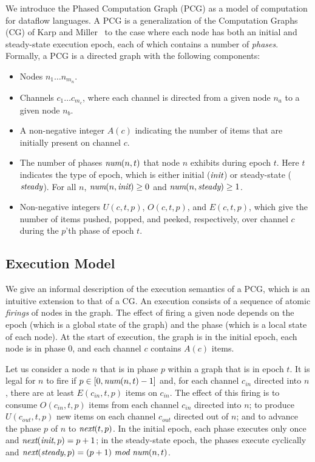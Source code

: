 We introduce the Phased Computation Graph (PCG) as a model of
computation for dataflow languages.  A PCG is a generalization of the
Computation Graphs (CG) of Karp and Miller~\cite{KM66} to the case
where each node has both an initial and steady-state execution epoch,
each of which contains a number of {\it phases}.  Formally, a PCG is a
directed graph with the following components:
\begin{itemize}

\item Nodes $n_1 \dots n_{m_n}$.

\item Channels $c_1 \dots c_{m_c}$, where each channel is directed
from a given node $n_a$ to a given node $n_b$.

\item A non-negative integer $A(c)$ indicating the number of items
  that are initially present on channel $c$.

\item The number of phases $\mbox{\it num}(n, t)$ that node $n$ exhibits
during epoch $t$.  Here $t$ indicates the type of epoch, which is
either initial ($\mbox{\it init}$) or steady-state ($\mbox{\it steady}$).  For all
$n$, $\mbox{\it num}(n, \mbox{\it init}) \ge 0$ and $\mbox{\it num}(n, \mbox{\it steady}) \ge
1$.

\item Non-negative integers $U(c, t, p)$, $O(c, t, p)$, and $E(c, t,
p)$, which give the number of items pushed, popped, and peeked,
respectively, over channel $c$ during the $p$'th phase of epoch $t$.

\end{itemize}

\subsection{Execution Model}

We give an informal description of the execution semantics of a PCG,
which is an intuitive extension to that of a CG.  An execution
consists of a sequence of atomic {\it firings} of nodes in the graph.
The effect of firing a given node depends on the epoch (which is a
global state of the graph) and the phase (which is a local state of
each node). At the start of execution, the graph is in the initial
epoch, each node is in phase 0, and each channel $c$ contains $A(c)$
items.

Let us consider a node $n$ that is in phase $p$ within a graph that is
in epoch $t$.  It is legal for $n$ to fire if $p \in [0, \mbox{\it num}(n,
t)-1]$ and, for each channel $c_{in}$ directed into $n$, there are at
least $E(c_{in}, t, p)$ items on $c_{in}$.  The effect of this firing
is to consume $O(c_{in}, t, p)$ items from each channel $c_{in}$
directed into $n$; to produce $U(c_{out}, t, p)$ new items on each
channel $c_{out}$ directed out of $n$; and to advance the phase $p$ of
$n$ to $\mbox{\it next}(t, p)$.  In the initial epoch, each phase executes
only once and $\mbox{\it next}(\mbox{\it init}, p) = p + 1$; in the
steady-state epoch, the phases execute cyclically and
$\mbox{\it next}(\mbox{\it steady}, p) = (p + 1)~\mbox{\it mod}~\mbox{\it num}(n, t)$.

